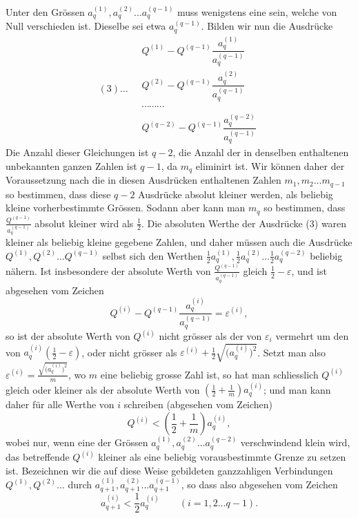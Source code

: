 \documentclass[10pt]{article}
\begin{document}
Unter den Grössen \(a_q^{(1)},a_q^{(2)}\ldots a_q^{(q-1)}\) muss wenigstens eine sein, welche von Null verschieden ist. Dieselbe sei etwa \(a_q^{(q-1)}\). Bilden wir nun die Ausdrücke
\[
(3)\ldots\quad
\begin{array}{c}
Q^{(1)}-Q^{(q-1)}\dfrac{a_q^{(1)}}{a_q^{(q-1)}}\\[0.45em]
Q^{(2)}-Q^{(q-1)}\dfrac{a_q^{(2)}}{a_q^{(q-1)}}\\[-0.1em]
\cdots\cdots\cdots\\[0.25em]
Q^{(q-2)}-Q^{(q-1)}\dfrac{a_q^{(q-2)}}{a_q^{(q-1)}}
\end{array}
\]
Die Anzahl dieser Gleichungen ist \(q-2\), die Anzahl der in denselben enthaltenen unbekannten ganzen Zahlen ist \(q-1\), da \(m_q\) eliminirt ist. Wir können daher der Voraussetzung nach die in diesen Ausdrücken enthaltenen Zahlen \(m_1,m_2\ldots m_{q-1}\) so bestimmen, dass diese \(q-2\) Ausdrücke absolut kleiner werden, als beliebig kleine vorherbestimmte Grössen. Sodann aber kann man \(m_q\) so bestimmen, dass \(\frac{Q^{(q-1)}}{a_q^{(q-1)}}\) absolut kleiner wird als \(\frac12\). Die absoluten Werthe der Ausdrücke (3) waren kleiner als beliebig kleine gegebene Zahlen, und daher müssen auch die Ausdrücke \(Q^{(1)},Q^{(2)}\ldots Q^{(q-1)}\) selbst sich den Werthen \(\frac12a_q^{(1)},\frac12a_q^{(2)}\ldots\frac12a_q^{(q-2)}\) beliebig nähern. Ist insbesondere der absolute Werth von \(\frac{Q^{(q-1)}}{a_q^{(q-1)}}\) gleich \(\frac12-\varepsilon\), und ist abgesehen vom Zeichen
\[
Q^{(i)}-Q^{(q-1)}\frac{a_q^{(i)}}{a_q^{(q-1)}}=\varepsilon^{(i)},
\]
so ist der absolute Werth von \(Q^{(i)}\) nicht grösser als der von \(\varepsilon_i\) vermehrt um den von \(a_q^{(i)}\left(\frac12-\varepsilon\right)\), oder nicht grösser als \(\varepsilon^{(i)}+\frac12\sqrt{\bigl(a_q^{(i)}\bigr)^2}\). Setzt man also \(\varepsilon^{(i)}=\frac{\sqrt{\bigl(a_q^{(i)}\bigr)^2}}{m}\), wo \(m\) eine beliebig grosse Zahl ist, so hat man schliesslich \(Q^{(i)}\) gleich oder kleiner als der absolute Werth von \(\left(\frac12+\frac1m\right)a_q^{(i)}\); und man kann daher für alle Werthe von \(i\) schreiben (abgesehen vom Zeichen)
\[
Q^{(i)}<\left(\frac12+\frac1m\right)a_q^{(i)},
\]
wobei nur, wenn eine der Grössen \(a_q^{(1)},a_q^{(2)}\ldots a_q^{(q-2)}\) verschwindend klein wird, das betreffende \(Q^{(i)}\) kleiner als eine beliebig vorausbestimmte Grenze zu setzen ist. Bezeichnen wir die auf diese Weise gebildeten ganzzahligen Verbindungen \(Q^{(1)},Q^{(2)}\ldots\) durch \(a_{q+1}^{(1)},a_{q+1}^{(2)}\ldots a_{q+1}^{(q-1)}\), so dass also abgesehen vom Zeichen
\[
a_{q+1}^{(i)}<\frac12a_q^{(i)}\qquad(i=1,2\ldots q-1).
\]
\end{document}
